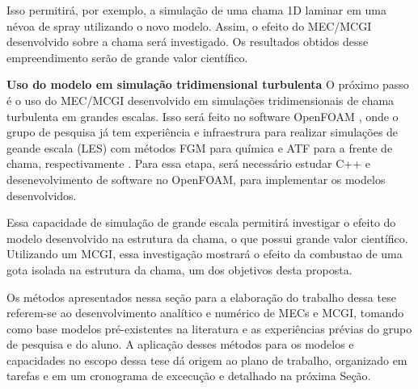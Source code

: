 Isso permitirá, por exemplo, a simulação de uma chama 1D laminar em uma névoa de spray utilizando o novo modelo.
Assim, o efeito do MEC/MCGI desenvolvido sobre a chama será investigado.
Os resultados obtidos desse empreendimento serão de grande valor científico.%


\textbf{Uso do modelo em simulação tridimensional turbulenta}
O próximo passo é o uso do MEC/MCGI desenvolvido em simulações tridimensionais de chama turbulenta em grandes escalas.
Isso será feito no software OpenFOAM \cite{JasakOpenFOAM}, onde o grupo de pesquisa já tem experiência e infraestrura para realizar simulações de geande escala (LES) com métodos FGM para química e ATF para a frente de chama, respectivamente \cite{SacomanoF2017PhD,SacomanoF2017CF,SacomanoF2020CF}.
Para essa etapa, será necessário estudar C++ e desenevolvimento de software no OpenFOAM, para implementar os modelos desenvolvidos.

Essa capacidade de simulação de grande escala permitirá investigar o efeito do modelo desenvolvido na estrutura da chama, o que possui grande valor científico.
Utilizando um MCGI, essa investigação mostrará o efeito da combustao de uma gota isolada na estrutura da chama, um dos objetivos desta proposta.

Os métodos apresentados nessa seção para a elaboração do trabalho dessa tese referem-se ao desenvolvimento analítico e numérico de MECs e MCGI, tomando como base modelos pré-existentes na literatura e as experiências prévias do grupo de pesquisa e do aluno.
A aplicação desses métodos para os modelos e capacidades no escopo dessa tese dá origem ao plano de trabalho, organizado em tarefas e em um cronograma de excecução e detalhado na próxima Seção.


